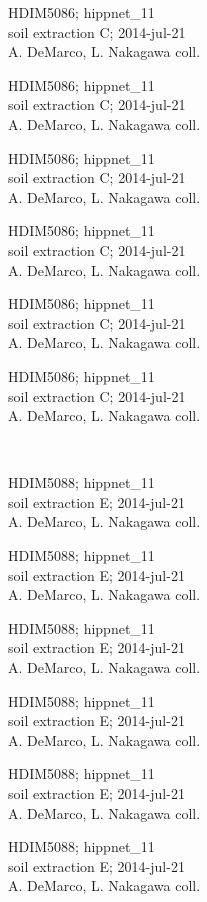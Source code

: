 \documentclass[2pt]{extarticle}
\begin{document}
\noindent
\parbox{0.16\textwidth}{\tiny \raggedright \rule[-0.3\baselineskip]{0pt}{10pt}HDIM5086; hippnet\_11\\ soil extraction C; 2014-jul-21\\ A. DeMarco, L. Nakagawa coll.}
\parbox{0.16\textwidth}{\tiny \raggedright \rule[-0.3\baselineskip]{0pt}{10pt}HDIM5086; hippnet\_11\\ soil extraction C; 2014-jul-21\\ A. DeMarco, L. Nakagawa coll.}
\parbox{0.16\textwidth}{\tiny \raggedright \rule[-0.3\baselineskip]{0pt}{10pt}HDIM5086; hippnet\_11\\ soil extraction C; 2014-jul-21\\ A. DeMarco, L. Nakagawa coll.}
\parbox{0.16\textwidth}{\tiny \raggedright \rule[-0.3\baselineskip]{0pt}{10pt}HDIM5086; hippnet\_11\\ soil extraction C; 2014-jul-21\\ A. DeMarco, L. Nakagawa coll.}
\parbox{0.16\textwidth}{\tiny \raggedright \rule[-0.3\baselineskip]{0pt}{10pt}HDIM5086; hippnet\_11\\ soil extraction C; 2014-jul-21\\ A. DeMarco, L. Nakagawa coll.}
\parbox{0.16\textwidth}{\tiny \raggedright \rule[-0.3\baselineskip]{0pt}{10pt}HDIM5086; hippnet\_11\\ soil extraction C; 2014-jul-21\\ A. DeMarco, L. Nakagawa coll.} \\ 
\vspace{0.001in} 

\noindent
\parbox{0.16\textwidth}{\tiny \raggedright \rule[-0.3\baselineskip]{0pt}{10pt}HDIM5088; hippnet\_11\\ soil extraction E; 2014-jul-21\\ A. DeMarco, L. Nakagawa coll.}
\parbox{0.16\textwidth}{\tiny \raggedright \rule[-0.3\baselineskip]{0pt}{10pt}HDIM5088; hippnet\_11\\ soil extraction E; 2014-jul-21\\ A. DeMarco, L. Nakagawa coll.}
\parbox{0.16\textwidth}{\tiny \raggedright \rule[-0.3\baselineskip]{0pt}{10pt}HDIM5088; hippnet\_11\\ soil extraction E; 2014-jul-21\\ A. DeMarco, L. Nakagawa coll.}
\parbox{0.16\textwidth}{\tiny \raggedright \rule[-0.3\baselineskip]{0pt}{10pt}HDIM5088; hippnet\_11\\ soil extraction E; 2014-jul-21\\ A. DeMarco, L. Nakagawa coll.}
\parbox{0.16\textwidth}{\tiny \raggedright \rule[-0.3\baselineskip]{0pt}{10pt}HDIM5088; hippnet\_11\\ soil extraction E; 2014-jul-21\\ A. DeMarco, L. Nakagawa coll.}
\parbox{0.16\textwidth}{\tiny \raggedright \rule[-0.3\baselineskip]{0pt}{10pt}HDIM5088; hippnet\_11\\ soil extraction E; 2014-jul-21\\ A. DeMarco, L. Nakagawa coll.} \\ 
\vspace{0.001in} 
\end{document}
